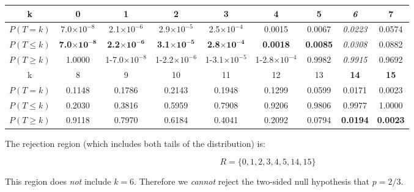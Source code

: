 \begin{center}
\begin{tabular}{c@{\gap}c@{\gap}c@{\gap}c@{\gap}c@{\gap}c@{\gap}c@{\gap}c@{\gap}c}
    k & \textbf{0} & \textbf{1} & \textbf{2} & \textbf{3} & \textbf{4}
    & \textbf{5} & \textit{6} & 7 \\ \hline $P(T=k)$ &
    7.0$\times{10}^{-8}$ & 2.1$\times{10}^{-6}$ & 2.9$\times{10}^{-5}$
    & 2.5$\times{10}^{-4}$ & 0.0015 & 0.0067 & \textit{0.0223} & 0.0574 \\
    $P({T}\leq{k})$ & \textbf{7.0}$\mathbf{\times{10}^{-8}}$ &
    \textbf{2.2}$\mathbf{\times{10}^{-6}}$ &
    \textbf{3.1}$\mathbf{\times{10}^{-5}}$ &
    \textbf{2.8}$\mathbf{\times{10}^{-4}}$ & \textbf{0.0018} &
    \textbf{0.0085} & \textit{0.0308} & 0.0882 \\
    $P({T}\geq{k})$ & 1.0000 &
    1-7.0$\times{10}^{-8}$ & 1-2.2$\times{10}^{-6}$ &
    1-3.1$\times{10}^{-5}$ & 1-2.8$\times{10}^{-4}$ & 0.9982 & \textit{0.9915}
    & 0.9692 \\ k & 8 & 9 & 10 & 11 & 12 & 13 & \textbf{14} & \textbf{15} \\ \hline
    $P(T=k)$ & 0.1148 & 0.1786 & 0.2143 & 0.1948
    & 0.1299 & 0.0599 & 0.0171 & 0.0023 \\
    $P({T}\leq{k})$ & 0.2030 &
    0.3816 & 0.5959 & 0.7908 & 0.9206 & 0.9806 & 0.9977 & 1.0000 \\
    $P({T}\geq{k})$ & 0.9118 & 0.7970 & 0.6184 & 0.4041 & 0.2092 &
    0.0794 & \textbf{0.0194} & \textbf{0.0023}
\end{tabular}
\end{center}

The rejection region (which includes both tails of the distribution)
is:

\begin{equation}
  R=\{0,1,2,3,4,5,14,15\}
  \label{eq:2sidedbinomtest15}
\end{equation}

This region does \emph{not} include $k=6$. Therefore we \emph{cannot}
reject the two-sided null hypothesis that $p=2/3$.\\

